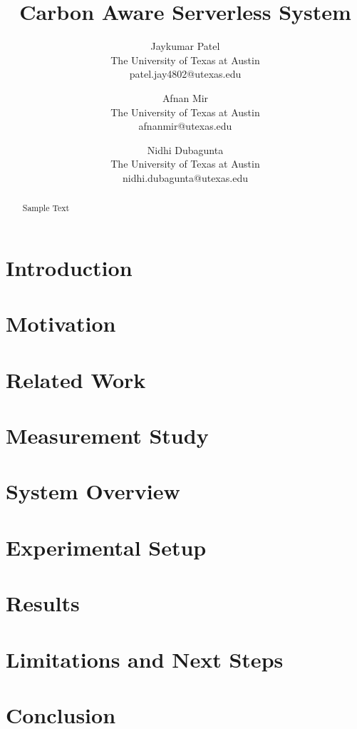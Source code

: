 \documentclass[times, 10pt,twocolumn]{article}
\begin{document}
\title{Carbon Aware Serverless System}

\author{Jaykumar Patel\\
The University of Texas at Austin\\
patel.jay4802@utexas.edu\\
\and
Afnan Mir\\
The University of Texas at Austin\\
afnanmir@utexas.edu\\
\and
Nidhi Dubagunta\\
The University of Texas at Austin\\
nidhi.dubagunta@utexas.edu
}



\maketitle
\thispagestyle{empty}

\begin{abstract}
   Sample Text
\end{abstract}


\section{Introduction}


\section{Motivation}


\section{Related Work}

\section{Measurement Study}

\section{System Overview}


\section{Experimental Setup}


\section{Results}


\section{Limitations and Next Steps}


\section{Conclusion}



\end{document}
